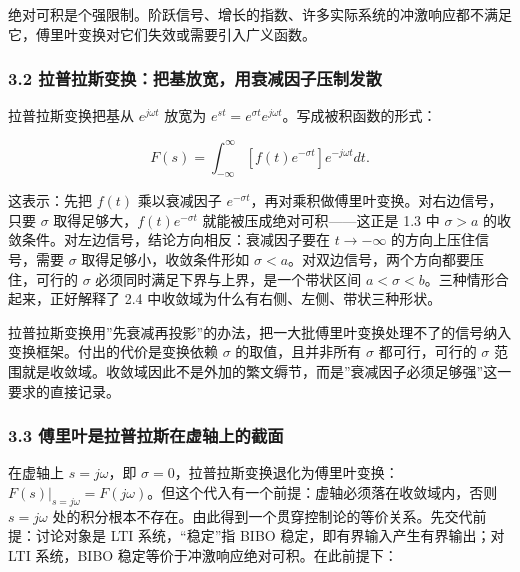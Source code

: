 \documentclass[12pt]{ctexart}
\begin{document}
绝对可积是个强限制。阶跃信号、增长的指数、许多实际系统的冲激响应都不满足它，傅里叶变换对它们失效或需要引入广义函数。

\hypertarget{ux62c9ux666eux62c9ux65afux53d8ux6362ux628aux57faux653eux5bbdux7528ux8870ux51cfux56e0ux5b50ux538bux5236ux53d1ux6563}{%
\subsubsection{3.2
拉普拉斯变换：把基放宽，用衰减因子压制发散}\label{ux62c9ux666eux62c9ux65afux53d8ux6362ux628aux57faux653eux5bbdux7528ux8870ux51cfux56e0ux5b50ux538bux5236ux53d1ux6563}}

拉普拉斯变换把基从 \(e^{j\omega t}\) 放宽为
\(e^{st}=e^{\sigma t}e^{j\omega t}\)。写成被积函数的形式：

\[
F(s)=\int_{-\infty}^{\infty}\left[f(t)e^{-\sigma t}\right]e^{-j\omega t}dt.
\]

这表示：先把 \(f(t)\) 乘以衰减因子
\(e^{-\sigma t}\)，再对乘积做傅里叶变换。对右边信号，只要 \(\sigma\)
取得足够大，\(f(t)e^{-\sigma t}\) 就能被压成绝对可积------这正是 1.3 中
\(\sigma>a\) 的收敛条件。对左边信号，结论方向相反：衰减因子要在
\(t\to-\infty\) 的方向上压住信号，需要 \(\sigma\)
取得足够小，收敛条件形如
\(\sigma<a\)。对双边信号，两个方向都要压住，可行的 \(\sigma\)
必须同时满足下界与上界，是一个带状区间
\(a<\sigma<b\)。三种情形合起来，正好解释了 2.4
中收敛域为什么有右侧、左侧、带状三种形状。

拉普拉斯变换用''先衰减再投影''的办法，把一大批傅里叶变换处理不了的信号纳入变换框架。付出的代价是变换依赖
\(\sigma\) 的取值，且并非所有 \(\sigma\) 都可行，可行的 \(\sigma\)
范围就是收敛域。收敛域因此不是外加的繁文缛节，而是''衰减因子必须足够强''这一要求的直接记录。

\hypertarget{ux5085ux91ccux53f6ux662fux62c9ux666eux62c9ux65afux5728ux865aux8f74ux4e0aux7684ux622aux9762}{%
\subsubsection{3.3
傅里叶是拉普拉斯在虚轴上的截面}\label{ux5085ux91ccux53f6ux662fux62c9ux666eux62c9ux65afux5728ux865aux8f74ux4e0aux7684ux622aux9762}}

在虚轴上 \(s=j\omega\)，即
\(\sigma=0\)，拉普拉斯变换退化为傅里叶变换：\(F(s)\big|_{s=j\omega}=F(j\omega)\)。但这个代入有一个前提：虚轴必须落在收敛域内，否则
\(s=j\omega\)
处的积分根本不存在。由此得到一个贯穿控制论的等价关系。先交代前提：讨论对象是
LTI 系统，``稳定''指 BIBO 稳定，即有界输入产生有界输出；对 LTI
系统，BIBO 稳定等价于冲激响应绝对可积。在此前提下：
\end{document}
